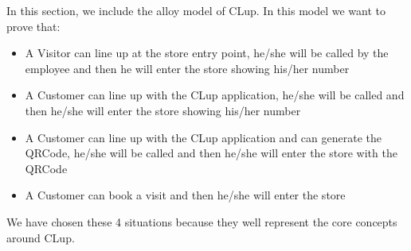 In this section, we include the alloy model of CLup. In this model we want to prove that:
\begin{itemize}
    \item A Visitor can line up at the store entry point, he/she will be called by the employee and then he will enter the store showing his/her number
    \item A Customer can line up with the CLup application, he/she will be called and then he/she will enter the store showing his/her number
    \item A Customer can line up with the CLup application and can generate the QRCode, he/she will be called and then he/she will enter the store with the QRCode
    \item A Customer can book a visit and then he/she will enter the store
\end{itemize}
We have chosen these 4 situations because they well represent the core concepts around CLup.